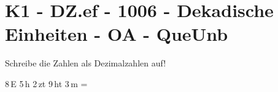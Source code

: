 \section{K1 - DZ.ef - 1006 - Dekadische Einheiten - OA - QueUnb}

\begin{beispiel}{0} %
				Schreibe die Zahlen als Dezimalzahlen auf!\leer
					
					8\,E 5\,h 2\,zt 9\,ht 3\,m = 
\end{beispiel}